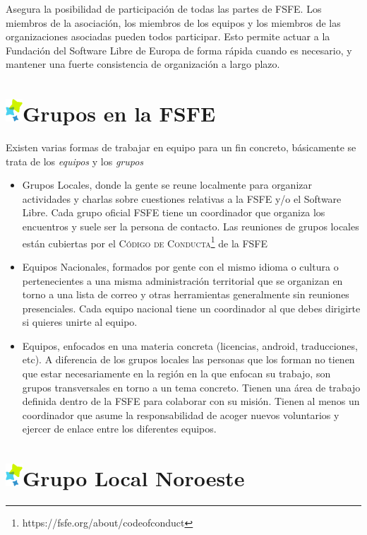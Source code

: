 \documentclass[10pt,foldmark,tumble]{leaflet}
\begin{document}
Asegura la posibilidad de participación de todas las partes de FSFE. Los miembros de la asociación, los miembros de los equipos y los miembros de las organizaciones asociadas pueden todos participar. Esto permite actuar a la Fundación del Software Libre de Europa de forma rápida cuando es necesario, y mantener una fuerte consistencia de organización a largo plazo.

\section{\includegraphics{item.png}Grupos en la FSFE}

Existen varias formas de trabajar en equipo para un fin concreto, básicamente se trata de los \textit{equipos} y los \textit{grupos}

\begin{itemize}
\item Grupos Locales, donde la gente se reune localmente para organizar actividades y charlas sobre cuestiones relativas a la FSFE y/o el Software Libre. Cada grupo oficial FSFE tiene un coordinador que organiza los encuentros y suele ser la persona de contacto. Las reuniones de grupos locales están cubiertas por el \textsc{Código de Conducta}\footnote{https://fsfe.org/about/codeofconduct} de la FSFE 
\item Equipos Nacionales, formados por gente con el mismo idioma o cultura o pertenecientes a una misma administración territorial que se organizan en torno a una lista de correo y otras herramientas generalmente sin reuniones presenciales. Cada equipo nacional tiene un coordinador al que debes dirigirte si quieres unirte al equipo.
\item Equipos, enfocados en una materia concreta (licencias, android, traducciones, etc). A diferencia de los grupos locales las personas que los forman no tienen que estar necesariamente en la región en la que enfocan su trabajo, son grupos transversales en torno a un tema concreto. Tienen una área de trabajo definida dentro de la FSFE para colaborar con su misión. Tienen al menos un coordinador que asume la responsabilidad de acoger nuevos voluntarios y ejercer de enlace entre los diferentes equipos.
\end{itemize}

\section{\includegraphics{item.png}Grupo Local Noroeste}
\end{document}
